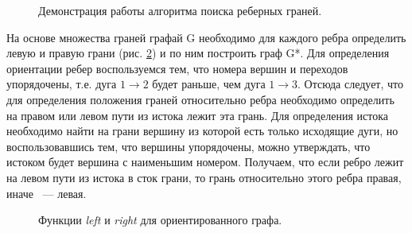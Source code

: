 \begin{figure}
\begin{minipage}[H]{0.49\linewidth}
	\end{minipage}
	\caption{Демонстрация работы алгоритма поиска реберных граней.}
	\label{fig:fig6}
\end{figure}

На основе множества граней графай G необходимо для каждого ребра определить левую и правую грани (рис. \ref{fig:fig7}) и по ним построить граф G*. Для определения ориентации ребер воспользуемся тем, что номера вершин и переходов упорядочены, т.е. дуга $ 1 \rightarrow 2 $ будет раньше, чем дуга $ 1 \rightarrow 3 $. Отсюда следует, что для определения положения граней относительно ребра необходимо определить на правом или левом пути из истока лежит эта грань. Для определения истока необходимо найти на грани вершину из которой есть только исходящие дуги, но воспользовавшись тем, что вершины упорядочены, можно утверждать, что истоком будет вершина с наименьшим номером. Получаем, что если ребро лежит на левом пути из истока в сток грани, то грань относительно этого ребра правая, иначе ~--- левая.

\begin{figure}
	\begin{minipage}[H]{0.49\linewidth}
	\end{minipage}
	\hfill
	\begin{minipage}[H]{0.49\linewidth}
	\end{minipage}
	\caption{Функции \textit{left} и \textit{right} для ориентированного графа.}
	\label{fig:fig7}
\end{figure}

